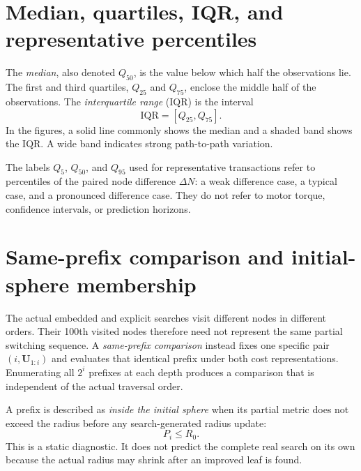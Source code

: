 \documentclass[paper=a4,oneside,fontsize=12pt,DIV=14,headings=normal,parskip=half,headsepline,numbers=noendperiod]{scrreprt}
\newcommand{\vct}[1]{\bm{#1}}
\begin{document}
\section{Median, quartiles, IQR, and representative percentiles}
The \emph{median}, also denoted $Q_{50}$, is the value below which half the
observations lie.  The first and third quartiles, $Q_{25}$ and $Q_{75}$,
enclose the middle half of the observations.  The \emph{interquartile range}
(IQR) is the interval
\begin{equation}
 \mathrm{IQR}=[Q_{25},Q_{75}].
\end{equation}
In the figures, a solid line commonly shows the median and a shaded band shows
the IQR.  A wide band indicates strong path-to-path variation.

The labels $Q_5$, $Q_{50}$, and $Q_{95}$ used for representative transactions
refer to percentiles of the paired node difference $\Delta N$: a weak
difference case, a typical case, and a pronounced difference case.  They do
not refer to motor torque, confidence intervals, or prediction horizons.

\section{Same-prefix comparison and initial-sphere membership}
The actual embedded and explicit searches visit different nodes in different
orders.  Their 100th visited nodes therefore need not represent the same
partial switching sequence.  A \emph{same-prefix comparison} instead fixes one
specific pair $(i,\vct U_{1:i})$ and evaluates that identical prefix under both
cost representations.  Enumerating all $2^i$ prefixes at each depth produces a
comparison that is independent of the actual traversal order.

A prefix is described as \emph{inside the initial sphere} when its partial
metric does not exceed the radius before any search-generated radius update:
\begin{equation}
 P_i\leq R_0.
\end{equation}
This is a static diagnostic.  It does not predict the complete real search on
its own because the actual radius may shrink after an improved leaf is found.
\end{document}
